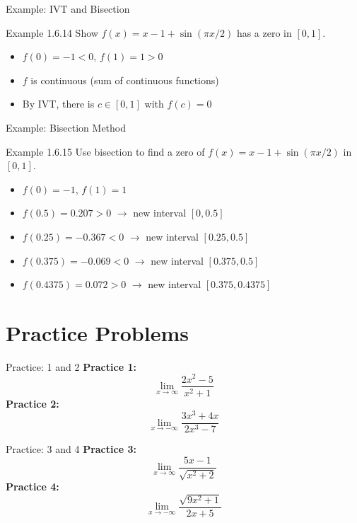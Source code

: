 \documentclass[aspectratio=169]{beamer}
\begin{document}
\begin{frame}{Example: IVT and Bisection}
\begin{block}{Example 1.6.14}
Show $f(x) = x-1+\sin(\pi x/2)$ has a zero in $[0,1]$.
\end{block}
\begin{itemize}
  \item $f(0) = -1 < 0$, $f(1) = 1 > 0$
  \item $f$ is continuous (sum of continuous functions)
  \item By IVT, there is $c \in [0,1]$ with $f(c)=0$
\end{itemize}
\end{frame}

\begin{frame}{Example: Bisection Method}
\begin{block}{Example 1.6.15}
Use bisection to find a zero of $f(x) = x-1+\sin(\pi x/2)$ in $[0,1]$.
\end{block}
\begin{itemize}
  \item $f(0) = -1$, $f(1) = 1$
  \item $f(0.5) = 0.207 > 0$ $\rightarrow$ new interval $[0,0.5]$
  \item $f(0.25) = -0.367 < 0$ $\rightarrow$ new interval $[0.25,0.5]$
  \item $f(0.375) = -0.069 < 0$ $\rightarrow$ new interval $[0.375,0.5]$
  \item $f(0.4375) = 0.072 > 0$ $\rightarrow$ new interval $[0.375,0.4375]$
\end{itemize}
\end{frame}

\section{Practice Problems}

\begin{frame}{Practice: 1 and 2}
\textbf{Practice 1:}
\[
\lim_{x \to \infty} \frac{2x^2-5}{x^2+1}
\]
\vspace{1em}
\textbf{Practice 2:}
\[
\lim_{x \to -\infty} \frac{3x^3+4x}{2x^3-7}
\]
\end{frame}

\begin{frame}{Practice: 3 and 4}
\textbf{Practice 3:}
\[
\lim_{x \to \infty} \frac{5x-1}{\sqrt{x^2+2}}
\]
\vspace{1em}
\textbf{Practice 4:}
\[
\lim_{x \to -\infty} \frac{\sqrt{9x^2+1}}{2x+5}
\]
\end{frame}
\end{document}
